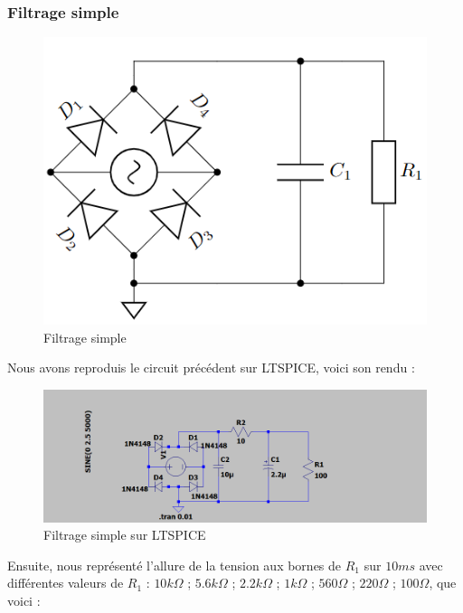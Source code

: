\subsubsection{Filtrage simple}

\begin{figure}[H]
    \begin{center}
    \includegraphics[scale=0.5]{images/5.png}
    \caption{Filtrage simple}
    \end{center}
\end{figure}

Nous avons reproduis le circuit précédent sur LTSPICE, voici son rendu : 

\begin{figure}[H]
    \begin{center}
    \includegraphics[scale=0.4]{images/LTSPICE/1.png}
    \caption{Filtrage simple sur LTSPICE}
    \end{center}
\end{figure}

Ensuite, nous représenté l’allure de la tension aux bornes de $R_1$ sur $10 ms$ avec différentes valeurs de $R_1$ : $10k\Omega$ ; $5.6k\Omega$ ;
$2.2k\Omega$ ; $1k\Omega$ ; $560\Omega$ ; $220\Omega$ ; $100\Omega$, que voici : 

